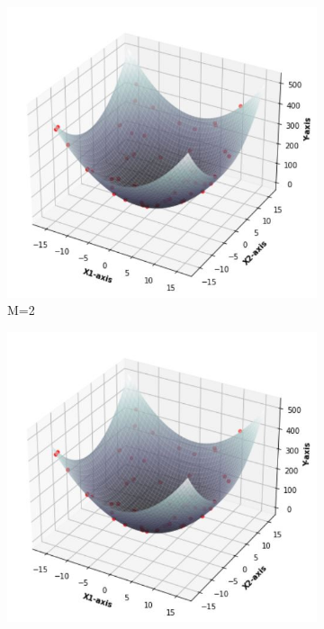 \documentclass[11pt]{article}
\begin{document}
\begin{figure}[h]
\centering
	\begin{subfigure}[b]{0.4\textwidth}
	\centering
	\includegraphics[scale=0.5]{dataset2_50_lambda0_m2funcplot.jpg}
	\caption{    M=2}
	\label{fig:fig2.1.1.1}
	\end{subfigure}
	\hfill
	\begin{subfigure}[b]{0.4\textwidth}
	\centering
	\includegraphics[scale=0.5]{dataset2_50_lambda0_m3funcplot.jpg}

\end{subfigure}
\end{figure}
\end{document}
